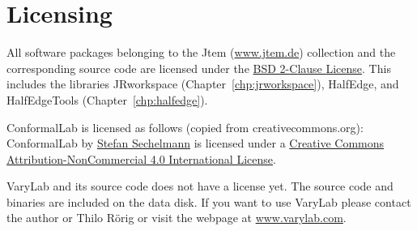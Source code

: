 \documentclass[Thesis]{subfiles}
\begin{document}
\section{Licensing}
All software packages belonging to the {\sc Jtem} (\href{http://www.jtem.de}{www.jtem.de}) collection and the corresponding source code are licensed under the \href{http://opensource.org/licenses/bsd-license.php}{{BSD} 2-{C}lause {L}icense}. This includes the libraries {\sc JRworkspace} (Chapter~\ref{chp:jrworkspace}), {\sc HalfEdge}, and {\sc HalfEdgeTools} (Chapter~\ref{chp:halfedge}).

{\sc ConformalLab} is licensed as follows (copied from creativecommons.org): {\sc ConformalLab} by \href{http://www.sechel.de}{Stefan Sechelmann} is licensed under a \href{http://creativecommons.org/licenses/by-nc/4.0/}{Creative Commons Attribution-NonCommercial 4.0 International License}.

{\sc VaryLab} and its source code does not have a license yet. The source code and binaries are included on the data disk. If you want to use {\sc VaryLab} please contact the author or Thilo R\"orig  or visit the webpage at \url{www.varylab.com}.
\end{document}
